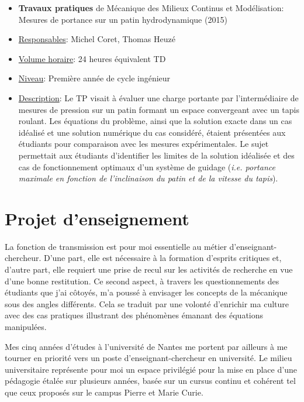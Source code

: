\begin{itemize}
\item \textbf{Travaux pratiques} de Mécanique des Milieux Continus et Modélisation: Mesures de portance sur un patin hydrodynamique (2015)
\item[] \underline{Responsables}: Michel Coret, Thomas Heuzé
\item[] \underline{Volume horaire}: 24 heures équivalent TD
\item[] \underline{Niveau}: Première année de cycle ingénieur
\item[] \underline{Description}: Le TP visait à évaluer une charge portante par l'intermédiaire de mesures de pression sur un patin formant un espace convergeant avec un tapis roulant. Les équations du problème, ainsi que la solution exacte dans un cas idéalisé et une solution numérique du cas considéré, étaient présentées aux étudiants pour comparaison avec les mesures expérimentales. Le sujet permettait aux étudiants d'identifier les limites de la solution idéalisée et des cas de fonctionnement optimaux d'un système de guidage (\textit{i.e. portance maximale en fonction de l'inclinaison du patin et de la vitesse du tapis}). 
\end{itemize}



\section{Projet d'enseignement}
La fonction de transmission est pour moi essentielle au métier d'enseignant-chercheur.
D'une part, elle est nécessaire à la formation d'esprits critiques et, d'autre part, elle requiert une prise de recul sur les activités de recherche en vue d'une bonne restitution.
Ce second aspect, à travers les questionnements des étudiants que j'ai côtoyés, m'a poussé à envisager les concepts de la mécanique sous des angles différents.
Cela se traduit par une volonté d'enrichir ma culture avec des cas pratiques illustrant des phénomènes émanant des équations manipulées.

Mes cinq années d'études à l'université de Nantes me portent par ailleurs à me tourner en priorité vers un poste d'enseignant-chercheur en université.
Le milieu universitaire représente pour moi un espace privilégié pour la mise en place d'une pédagogie étalée sur plusieurs années, basée sur un cursus continu et cohérent tel que ceux proposés sur le campus Pierre et Marie Curie.

